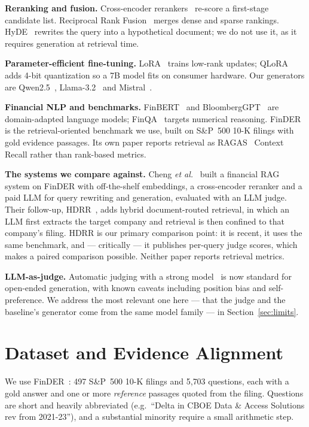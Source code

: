 \documentclass[conference]{IEEEtran}
\begin{document}
\textbf{Reranking and fusion.} Cross-encoder
rerankers~\cite{nogueira2019passage} re-score a first-stage candidate list.
Reciprocal Rank Fusion~\cite{cormack2009rrf} merges dense and sparse rankings.
HyDE~\cite{gao2022hyde} rewrites the query into a hypothetical document; we do
not use it, as it requires generation at retrieval time.

\textbf{Parameter-efficient fine-tuning.} LoRA~\cite{hu2021lora} trains low-rank
updates; QLoRA~\cite{dettmers2023qlora} adds 4-bit quantization so a 7B model
fits on consumer hardware. Our generators are
Qwen2.5~\cite{qwen2024}, Llama-3.2~\cite{touvron2023llama} and
Mistral~\cite{jiang2023mistral}.

\textbf{Financial NLP and benchmarks.} FinBERT~\cite{araci2019finbert} and
BloombergGPT~\cite{wu2023bloomberggpt} are domain-adapted language models;
FinQA~\cite{chen2021finqa} targets numerical reasoning.
FinDER~\cite{finder2025} is the retrieval-oriented benchmark we use, built on
S\&P~500 10-K filings with gold evidence passages. Its own paper reports
retrieval as RAGAS~\cite{es2023ragas} Context Recall rather than rank-based
metrics.

\textbf{The systems we compare against.} Cheng \textit{et
al.}~\cite{basepaper2026} built a financial RAG system on FinDER with
off-the-shelf embeddings, a cross-encoder reranker and a paid LLM for query
rewriting and generation, evaluated with an LLM judge. Their follow-up,
HDRR~\cite{hdrr2026}, adds hybrid document-routed retrieval, in which an LLM
first extracts the target company and retrieval is then confined to that
company's filing. HDRR is our primary comparison point: it is recent, it uses
the same benchmark, and --- critically --- it publishes per-query judge scores,
which makes a paired comparison possible. Neither paper reports retrieval
metrics.

\textbf{LLM-as-judge.} Automatic judging with a strong
model~\cite{zheng2023judge} is now standard for open-ended generation, with
known caveats including position bias and self-preference. We address the most
relevant one here --- that the judge and the baseline's generator come from the
same model family --- in Section~\ref{sec:limits}.

\section{Dataset and Evidence Alignment}
\label{sec:data}
We use FinDER~\cite{finder2025}: 497 S\&P~500 10-K filings and 5{,}703
questions, each with a gold answer and one or more \emph{reference} passages
quoted from the filing. Questions are short and heavily abbreviated
(e.g.\ ``Delta in CBOE Data \& Access Solutions rev from 2021-23''), and a
substantial minority require a small arithmetic step.
\end{document}
